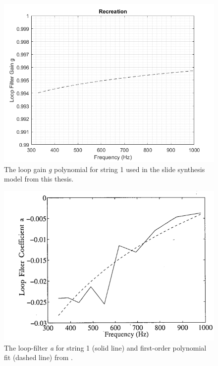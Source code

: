 \documentclass[../main.tex]{subfiles}
\begin{document}
\begin{figure}[h!]
    \centering
    \includegraphics[scale=.50]{./images/plots/Figure18Recon.png}
    \caption{The loop gain \emph{g} polynomial for string 1 used in the slide synthesis model from this thesis.}
    \label{fig:Fig18Recon}
\end{figure}

\clearpage

\begin{figure}[h!]
    \centering
    \includegraphics[scale=.75]{./images/plots/Figure19Orig.png}
    \caption{The loop-filter \emph{a} for string 1 (solid line) and first-order polynomial fit (dashed line) from .}
    \label{fig:Fig19Orig}
\end{figure}
\end{document}
